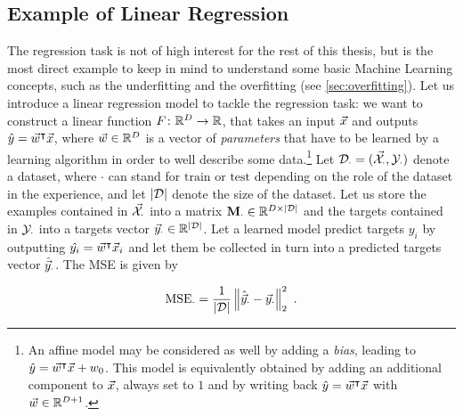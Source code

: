 
\subsection{Example of Linear Regression}
The regression task is not of high interest for the rest of this thesis, but is the most direct example to keep in mind to understand some basic Machine Learning concepts, such as the underfitting and the overfitting (see \ref{sec:overfitting}). Let us introduce a linear regression model to tackle the regression task: we want to construct a linear function $F\colon \mathbb{R}^D \rightarrow \mathbb{R}$, that takes an input $\vec{x}$ and outputs $\hat{y} = \vec{w}^\intercal \vec{x}$, where $\vec{w}\in \mathbb{R}^D$ is a vector of \emph{parameters} that have to be learned by a learning algorithm in order to well describe some data.\footnote{An affine model may be considered as well by adding a \emph{bias}, leading to $\hat{y} = \vec{w}^\intercal \vec{x}+w_0$. This model is equivalently obtained by adding an additional component to $\vec{x}$, always set to $1$ and by writing back $\hat{y} = \vec{w}^\intercal \vec{x}$ with $\vec{w}\in \mathbb{R}^{D+1}$. } 
Let $\mathcal{D}_{\cdot} = (\vec{\mathcal{X}}_{\cdot}, \mathcal{Y}_{\cdot})$ denote a dataset, where $\cdot$ can stand for $\text{train}$ or $\text{test}$ depending on the role of the dataset in the experience, and let $\lvert\mathcal{D}\rvert$ denote the size of the dataset. Let us store the examples contained in $\vec{\mathcal{X}}_{\cdot}$ into a matrix $\textbf{M}_{\cdot}\in \mathbb{R}^{D \times \lvert\mathcal{D}\rvert}$ and the targets contained in $\mathcal{Y}_{\cdot}$ into a targets vector $\vec{y}_{\cdot}\in \mathbb{R}^{\lvert\mathcal{D}\rvert}$. Let a learned model predict targets $y_i$ by outputting $\hat{y_i} = \vec{w}^\intercal\vec{x}_i$ and let them be collected in turn into a predicted targets vector $\hat{\vec{y}}_{\cdot}$. The MSE is given by 

\begin{equation}
 \mathrm{MSE_{\cdot}} = \frac{1}{\lvert\mathcal{D}\rvert} \left\lVert\hat{\vec{y}}_{\cdot}-\vec{y}_{\cdot}\right\rVert^2_2 \mbox{ .}
\end{equation}

